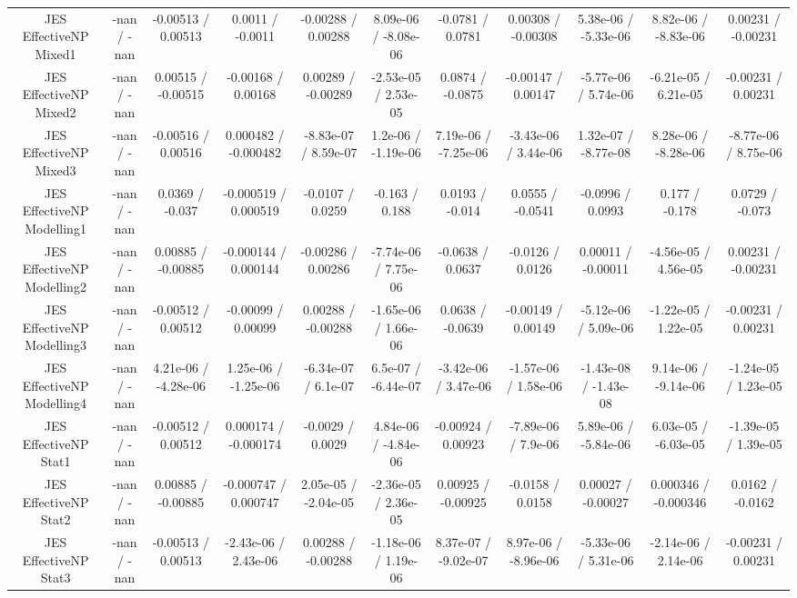 \begin{table}[htbp]
\begin{center}
\begin{tabular}{|c|c|c|c|c|c|c|c|c|c|c|}
  JES EffectiveNP Mixed1 & -nan / -nan & -0.00513 / 0.00513 & 0.0011 / -0.0011 & -0.00288 / 0.00288 & 8.09e-06 / -8.08e-06 & -0.0781 / 0.0781 & 0.00308 / -0.00308 & 5.38e-06 / -5.33e-06 & 8.82e-06 / -8.83e-06 & 0.00231 / -0.00231 \\ 
  JES EffectiveNP Mixed2 & -nan / -nan & 0.00515 / -0.00515 & -0.00168 / 0.00168 & 0.00289 / -0.00289 & -2.53e-05 / 2.53e-05 & 0.0874 / -0.0875 & -0.00147 / 0.00147 & -5.77e-06 / 5.74e-06 & -6.21e-05 / 6.21e-05 & -0.00231 / 0.00231 \\ 
  JES EffectiveNP Mixed3 & -nan / -nan & -0.00516 / 0.00516 & 0.000482 / -0.000482 & -8.83e-07 / 8.59e-07 & 1.2e-06 / -1.19e-06 & 7.19e-06 / -7.25e-06 & -3.43e-06 / 3.44e-06 & 1.32e-07 / -8.77e-08 & 8.28e-06 / -8.28e-06 & -8.77e-06 / 8.75e-06 \\ 
  JES EffectiveNP Modelling1 & -nan / -nan & 0.0369 / -0.037 & -0.000519 / 0.000519 & -0.0107 / 0.0259 & -0.163 / 0.188 & 0.0193 / -0.014 & 0.0555 / -0.0541 & -0.0996 / 0.0993 & 0.177 / -0.178 & 0.0729 / -0.073 \\ 
  JES EffectiveNP Modelling2 & -nan / -nan & 0.00885 / -0.00885 & -0.000144 / 0.000144 & -0.00286 / 0.00286 & -7.74e-06 / 7.75e-06 & -0.0638 / 0.0637 & -0.0126 / 0.0126 & 0.00011 / -0.00011 & -4.56e-05 / 4.56e-05 & 0.00231 / -0.00231 \\ 
  JES EffectiveNP Modelling3 & -nan / -nan & -0.00512 / 0.00512 & -0.00099 / 0.00099 & 0.00288 / -0.00288 & -1.65e-06 / 1.66e-06 & 0.0638 / -0.0639 & -0.00149 / 0.00149 & -5.12e-06 / 5.09e-06 & -1.22e-05 / 1.22e-05 & -0.00231 / 0.00231 \\ 
  JES EffectiveNP Modelling4 & -nan / -nan & 4.21e-06 / -4.28e-06 & 1.25e-06 / -1.25e-06 & -6.34e-07 / 6.1e-07 & 6.5e-07 / -6.44e-07 & -3.42e-06 / 3.47e-06 & -1.57e-06 / 1.58e-06 & -1.43e-08 / -1.43e-08 & 9.14e-06 / -9.14e-06 & -1.24e-05 / 1.23e-05 \\ 
  JES EffectiveNP Stat1 & -nan / -nan & -0.00512 / 0.00512 & 0.000174 / -0.000174 & -0.0029 / 0.0029 & 4.84e-06 / -4.84e-06 & -0.00924 / 0.00923 & -7.89e-06 / 7.9e-06 & 5.89e-06 / -5.84e-06 & 6.03e-05 / -6.03e-05 & -1.39e-05 / 1.39e-05 \\ 
  JES EffectiveNP Stat2 & -nan / -nan & 0.00885 / -0.00885 & -0.000747 / 0.000747 & 2.05e-05 / -2.04e-05 & -2.36e-05 / 2.36e-05 & 0.00925 / -0.00925 & -0.0158 / 0.0158 & 0.00027 / -0.00027 & 0.000346 / -0.000346 & 0.0162 / -0.0162 \\ 
  JES EffectiveNP Stat3 & -nan / -nan & -0.00513 / 0.00513 & -2.43e-06 / 2.43e-06 & 0.00288 / -0.00288 & -1.18e-06 / 1.19e-06 & 8.37e-07 / -9.02e-07 & 8.97e-06 / -8.96e-06 & -5.33e-06 / 5.31e-06 & -2.14e-06 / 2.14e-06 & -0.00231 / 0.00231 \\ 

\end{tabular}
\end{center}
\end{table}
